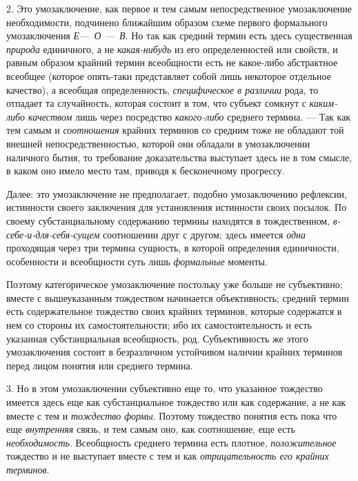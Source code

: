 \documentclass[twoside]{article}
\begin{document}
{{{{{{2. Это умозаключение, как первое и тем самым непосредственное
умозаключение необходимости, подчинено ближайшим образом схеме первого
формального умозаключения {\em Е—~О —~В}. Но так как средний
термин есть здесь существенная
{\em природа} единичного,
а не {\em какая-нибудь}
из его определенностей или свойств, и равным образом крайний
термин всеобщности есть не какое-либо абстрактное всеобщее (которое
опять-таки представляет собой лишь некоторое отдельное качество), а
всеобщая определенность,
{\em специфическое в различии}
рода, то отпадает та случайность, которая состоит в том, что
субъект сомкнут с {\em каким-либо
качеством} лишь через посредство
{\em какого-либо}
среднего термина. — Так как тем самым и
{\em соотношения} крайних
терминов со средним тоже не обладают той внешней непосредственностью,
которой они обладали в умозаключении наличного бытия, то требование
доказательства выступает здесь не в том смысле, в каком оно
имело место там, приводя к бесконечному прогрессу.

Далее: это умозаключение не предполагает, подобно
умозаключению рефлексии, истинности своего заключения для установления
истинности своих посылок. По своему субстанциальному содержанию термины
находятся в тождественном,
{\em в-себе-и-для-себя-сущем}
соотношении друг с другом; здесь имеется
{\em одна} проходящая
через три термина сущность, в которой определения единичности, особенности
и всеобщности суть лишь
{\em формальные}
моменты.

Поэтому категорическое умозаключение постольку уже больше не
субъективно; вместе с вышеуказанным тождеством начинается объективность;
средний термин есть содержательное тождество своих крайних терминов,
которые содержатся в нем со стороны их самостоятельности; ибо их
самостоятельность и есть указанная субстанциальная всеобщность, род.
Субъективность же этого умозаключения состоит в безразличном устойчивом
наличии крайних терминов перед лицом понятия или среднего термина.

3. Но в этом умозаключении субъективно еще то, что указанное
тождество имеется здесь еще как субстанциальное тождество или как
содержание, а не как вместе с тем и
{\em тождество формы}.
Поэтому тождество понятия есть пока что еще
{\em внутренняя} связь, и
тем самым оно, как соотношение, еще есть
{\em необходимость}.
Всеобщность среднего термина есть плотное,
{\em положительное}
тождество и не выступает вместе с тем и как
{\em отрицательность его крайних
терминов}.

}}}}}}
\end{document}
